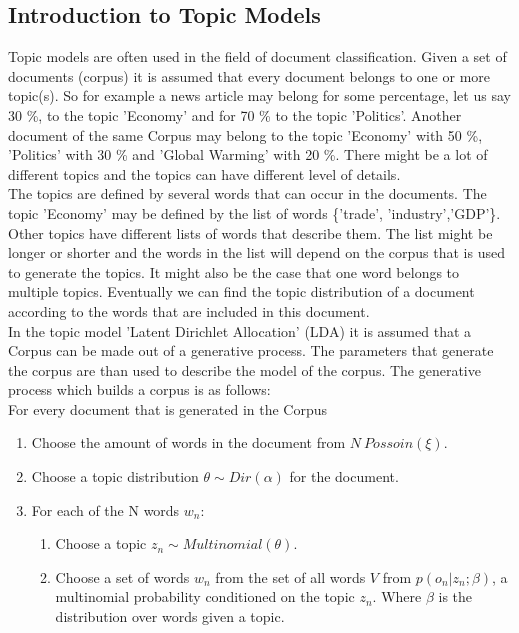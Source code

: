 \documentclass[a4paper,fleqn]{article}
\begin{document}
\subsection{Introduction to Topic Models}
Topic models are often used in the field of document classification. Given a set of documents (corpus) it is assumed that every document belongs to one or more topic(s). So for example a news article may belong for some percentage, let us say 30 \%,  to the topic 'Economy' and for 70 \%  to the topic 'Politics'. Another document of the same Corpus may belong to the topic 'Economy' with 50 \%, 'Politics' with 30 \% and 'Global Warming' with 20 \%. There might be a lot of different topics and the topics can have different level of details. 
\\
The topics are defined by several words that can occur in the documents. The topic 'Economy' may be defined by the list of words \{'trade', 'industry','GDP'\}. Other topics have different lists of words that describe them. The list might be longer or shorter and the words in the list will depend on the corpus that is used to generate the topics. It might also be the case that one word belongs to multiple topics. Eventually we can find the topic distribution of a document according to the words that are included in this document.\\
In the topic model 'Latent Dirichlet Allocation' (LDA) it is assumed that a Corpus can be made out of a generative process. The parameters that generate the corpus are than used to describe the model of the corpus. The generative process which builds a corpus is as follows:
\\
For every document that is generated in the Corpus
\begin{enumerate}
 \item Choose the amount of words in the document from $N~Possoin(\xi)$.
 \item Choose a topic distribution $\theta \sim Dir(\alpha)$ for the document.
 \item For each of the N words $w_n$:
 
 \begin{enumerate}
  \item Choose a topic $z_n \sim Multinomial(\theta)$.
  \item Choose a set of words $w_n$ from the set of all words $V$ from $p(o_n |z_n;\beta)$, a multinomial probability conditioned on the topic $z_n$. Where $\beta$ is the distribution over words given a topic.
 \end{enumerate}

\end{enumerate}
\end{document}
